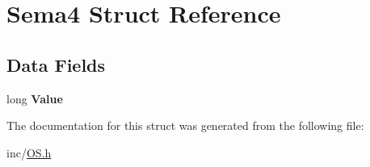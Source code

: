\hypertarget{structSema4}{}\section{Sema4 Struct Reference}
\label{structSema4}
\subsection*{Data Fields}
\begin{DoxyCompactItemize}
\item 
long {\bfseries Value}\hypertarget{structSema4_a98b1e5b4f3a76692bb37db553c22e8b0}{}\label{structSema4_a98b1e5b4f3a76692bb37db553c22e8b0}

\end{DoxyCompactItemize}


The documentation for this struct was generated from the following file\+:\begin{DoxyCompactItemize}
\item 
inc/\hyperlink{OS_8h}{O\+S.\+h}\end{DoxyCompactItemize}
